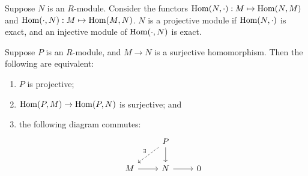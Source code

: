 \begin{definition}
    Suppose \(N\) is an \(R\)-module.
    Consider the functors \(\operatorname{Hom}(N,\cdot): M \mapsto \operatorname{Hom}(N,M)\) and \(\operatorname{Hom}(\cdot,N): M \mapsto \operatorname{Hom}(M,N)\).
    \(N\) is a projective module if \(\operatorname{Hom}(N,\cdot)\) is exact,
    and an injective module of \(\operatorname{Hom}(\cdot,N)\) is exact.
\end{definition}
\begin{proposition}\label{prop:projective-module}
    Suppose \(P\) is an \(R\)-module,
    and \(M \to N\) is a surjective homomorphism.
    Then the following are equivalent:
    \begin{enumerate}[label={(\roman*)}, itemsep=0mm]
        \item \(P\) is projective;
        \item \(\operatorname{Hom}(P,M) \to \operatorname{Hom}(P,N)\) is surjective; and
        \item the following diagram commutes:
            \begin{equation*}
                \begin{tikzcd}
                    & P \arrow[dashrightarrow]{dl}[swap]{\exists} \arrow{d} \\
                    M \arrow{r} & N \arrow{r} & 0
                \end{tikzcd}
            \end{equation*}
    \end{enumerate}
\end{proposition}
